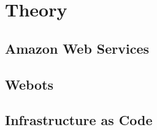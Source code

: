 
\chapter{Theory}


\section{Amazon Web Services}


\section{Webots}


\section{Infrastructure as Code}
